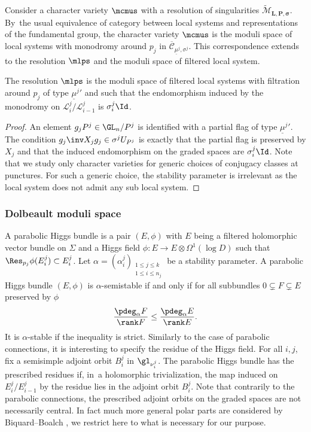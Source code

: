 Consider a character variety $\mcmus$ with a resolution of singularities $\widetilde{\mathcal{M}}_{\boldsymbol{L},\boldsymbol{P}, \boldsymbol{\sigma}}$. By~the usual equivalence of category between local systems and representations of the fundamental group, the character variety $\mcmus$ is the moduli space of local systems with monodromy around $p_{j}$ in $\overline{\mathcal{C}}_{\underline{\mu}^j,\sigma^j}$. This correspondence extends to the resolution $\mlps$ and the moduli space of filtered local system.
\begin{proposition}\label{proposition_filtered_moduli_resolu}
The resolution $\mlps$ is the moduli space of filtered local systems with filtration around $p_j$ of type ${\underline{\mu}^j}'$ and such that the endomorphism induced by the monodromy on $\mathcal{L}^j_i/\mathcal{L}^j_{i-1}$ is $\sigma^j_i \Id$.
\end{proposition}
\begin{proof}
An element $g_j P^j \in \GL_n /P^j$ is identified with a partial flag of type ${\underline{\mu}^j}'$.
The condition $g_j\inv X_j g_j \in \sigma^j U_{P^j}$
is exactly that the partial flag is preserved by $X_j$
and that the induced endomorphism on the graded spaces are $\sigma_i^j \Id$.
Note that we study only character varieties for generic choices of conjugacy classes at punctures. For such a generic choice, the stability parameter is irrelevant as the local system does not admit any sub local system.
\end{proof}

\subsubsection{Dolbeault moduli space}\label{subsect_dol_alg}
A parabolic Higgs bundle is a pair $(E,\phi)$ with $E$ being a filtered holomorphic vector bundle on $\Sigma$ and a Higgs field $\phi : E \to E\otimes \Omega^1(\log D) $ such that $\Res_{p_j}\phi (E^j_i)\subset E^j_i$. Let $\alpha =(\alpha^j_i)_{\substack{1\le j \le k \\ 1 \le i \le n_j}}$ be a stability parameter. A parabolic Higgs bundle $(E,\phi)$ is $\alpha$-semistable if and only if for all subbundles $0\subsetneq F\subsetneq E$ preserved by $\phi$
\[
\frac{\pdeg_{\alpha} F}{\rank F} \le \frac{\pdeg_{\alpha} E}{\rank E}.
\]
It is $\alpha$-stable if the inequality is strict.
Similarly to the case of parabolic connections, it is interesting to specify the residue of the Higgs field. For all $i,j$, fix a semisimple adjoint orbit $B^j_i$ in $\gl_{\nu^j_i}$. The parabolic Higgs bundle has the prescribed residues if, in~a holomorphic trivialization, the map induced on $E^j_i / E^j_{i-1}$ by the residue lies in the adjoint orbit $B^j_i$. Note that contrarily to the parabolic connections, the prescribed adjoint orbits on the graded spaces are not necessarily central. In fact much more general polar parts are considered by Biquard--Boalch \cite{Biquard_Boalch_2004}, we restrict here to what is necessary for our purpose.

